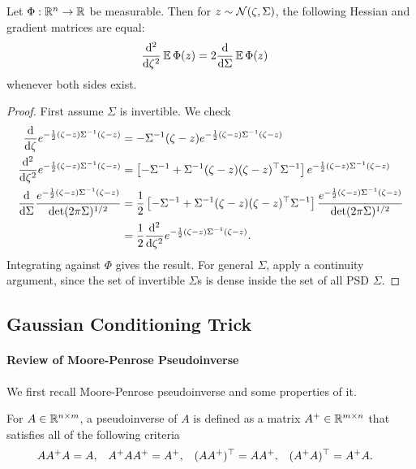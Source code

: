 \documentclass[main.tex]{subfiles}
\begin{document}
\begin{lemma}\label{lemma:gaussianDer}
Let $\Phi: \mathbb{R}^n \to \mathbb{R}$ be measurable.
Then for $z \sim \mathcal{N}(\zeta, \Sigma)$, the following Hessian and gradient matrices are equal:
\begin{align*}
    \frac{\mathop{}\!\mathrm{d} ^2}{\mathop{}\!\mathrm{d} \zeta^2} \operatorname*{\mathbb{E}} \Phi(z)
        &=
            2\frac{\mathop{}\!\mathrm{d} }{\mathop{}\!\mathrm{d} \Sigma} \operatorname*{\mathbb{E}} \Phi(z)
\end{align*}
whenever both sides exist.
\end{lemma}
\begin{proof}
First assume $\Sigma$ is invertible.
We check
\begin{align*}
    \Jac{}{\zeta} e^{-\f 1 2 (\zeta-z)\inv \Sigma (\zeta-z)}
        &=
            - \inv \Sigma (\zeta - z)
            e^{-\f 1 2 (\zeta-z)\inv \Sigma (\zeta-z)}
            \\
    \Jac{^2}{\zeta^2} e^{-\f 1 2 (\zeta-z)\inv \Sigma (\zeta-z)}
        &=
            \left[
                - \inv \Sigma
                + \inv \Sigma (\zeta-z) (\zeta-z)^\trsp \inv \Sigma
            \right]
            e^{-\f 1 2 (\zeta-z)\inv \Sigma (\zeta-z)}
            \\
    \Jac{}{\Sigma} \f{e^{-\f 1 2 (\zeta-z)\inv \Sigma (\zeta-z)}}{
                    \det(2\pi \Sigma)^{1/2}}
        &=
            \f 1 2 \left[
                - \inv \Sigma
                + \inv \Sigma (\zeta-z) (\zeta-z)^\trsp \inv \Sigma
            \right]
            \f{e^{-\f 1 2 (\zeta-z)\inv \Sigma (\zeta-z)}}{
                    \det(2\pi \Sigma)^{1/2}}
            \\
        &=
            \f 1 2
            \Jac{^2}{\zeta^2} e^{-\f 1 2 (\zeta-z)\inv \Sigma (\zeta-z)}
            .
\end{align*}
Integrating against $\Phi$ gives the result.
For general $\Sigma$, apply a continuity argument, since the set of invertible $\Sigma$s is dense inside the set of all PSD $\Sigma$.
\end{proof}

\subsection{Gaussian Conditioning Trick}

\paragraph{Review of Moore-Penrose Pseudoinverse}

We first recall Moore-Penrose pseudoinverse and some properties of it.
\begin{defn}\label{defn:pseuodoinverse}
For $A \in \mathbb{R}^{n \times m}$, a pseudoinverse of $A$ is defined as a matrix $A^+ \in \mathbb{R}^{m \times n}$ that satisfies all of the following criteria
\begin{align*}
  A A^+ A &= A,&
  A^+ A A^+ &= A^+,&
  (AA^+)^\top &= AA^+,&
  (A^+ A)^\top &= A^+ A
  .
\end{align*}
\end{defn}
\end{document}
